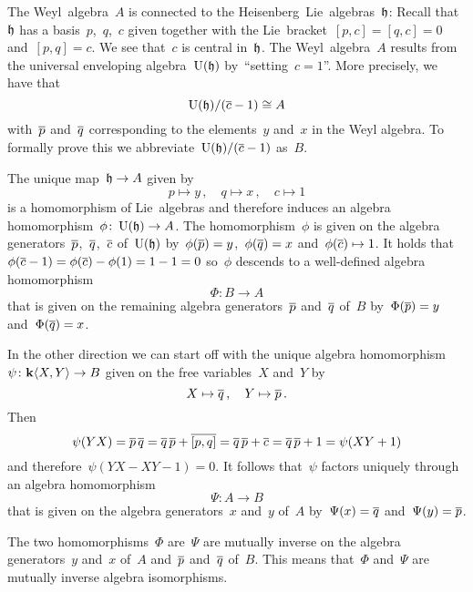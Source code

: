 \begin{remark}
  The Weyl~algebra~$A$ is connected to the {\threedimensional} Heisenberg~Lie~algebras~$\mathfrak{h}$:
  Recall that~$\mathfrak{h}$ has a basis~$p$,~$q$,~$c$ given together with the Lie~bracket~$[p,c] = [q,c] = 0$ and~$[p,q] = c$.
  We see that~$c$ is central in~$\mathfrak{h}$.
  The Weyl~algebra~$A$ results from the universal enveloping algebra~$\operatorname{U}(\mathfrak{h})$ by~\enquote{setting~$c = 1$}.
  More precisely, we have that
  \[
    \operatorname{U}(\mathfrak{h})/(\overline{c} - 1)
    \cong
    A
  \]
  with~$\overline{p}$ and~$\overline{q}$ corresponding to the elements~$y$ and~$x$ in the Weyl algebra.
  To formally prove this we abbreviate~$\operatorname{U}(\mathfrak{h})/(\overline{c} - 1)$ as~$B$.
  
  The unique {\linear{$\kf$}} map~$\mathfrak{h} \to A$ given by
  \[
    p \mapsto y \,,
    \quad
    q \mapsto x \,,
    \quad
    c \mapsto 1
  \]
  is a homomorphism of Lie~algebras and therefore induces an algebra homomorphism~$\phi \colon \operatorname{U}(\mathfrak{h}) \to A$.
  The homomorphism~$\phi$ is given on the algebra generators~$\overline{p}$,~$\overline{q}$,~$\overline{c}$ of~$\operatorname{U}(\mathfrak{h})$ by~$\phi(\overline{p}) = y$,~$\phi(\overline{q}) = x$ and~$\phi(\overline{c}) \mapsto 1$.
  It holds that~$\phi(\overline{c} - 1) = \phi(\overline{c}) - \phi(1) = 1 - 1 = 0$ so~$\phi$ descends to a well-defined algebra homomorphism
  \[
    \Phi
    \colon
    B
    \to
    A
  \]
  that is given on the remaining algebra generators~$\overline{p}$ and~$\overline{q}$ of~$B$ by~$\Phi(\overline{p}) = y$ and~$\Phi(\overline{q}) = x$.
  
  In the other direction we can start off with the unique algebra homomorphism~$\psi \colon \mathbf{k}\langle X,Y\rangle \to B$ given on the free variables~$X$ and~$Y$ by
  \[
    X \mapsto \overline{q} \,,
    \quad
    Y \mapsto \overline{p} \,.
  \]
  Then
  \[
    \psi(YX)
    =
    \overline{p} \, \overline{q}
    =
    \overline{q} \, \overline{p} + \overline{[p,q]}
    =
    \overline{q} \, \overline{p} + \overline{c}
    =
    \overline{q} \, \overline{p} + 1
    =
    \psi(XY + 1)
  \]
  and therefore~$\psi(YX - XY - 1) = 0$.
  It follows that~$\psi$ factors uniquely through an algebra homomorphism
  \[
    \Psi
    \colon
    A
    \to
    B
  \]
  that is given on the algebra generators~$x$ and~$y$ of~$A$ by~$\Psi(x) = \overline{q}$ and~$\Psi(y) = \overline{p}$.
  
  The two homomorphisms~$\Phi$ are~$\Psi$ are mutually inverse on the algebra generators~$y$ and~$x$ of~$A$ and~$\overline{p}$ and~$\overline{q}$ of~$B$.
  This means that~$\Phi$ and~$\Psi$ are mutually inverse algebra isomorphisms.
\end{remark}


